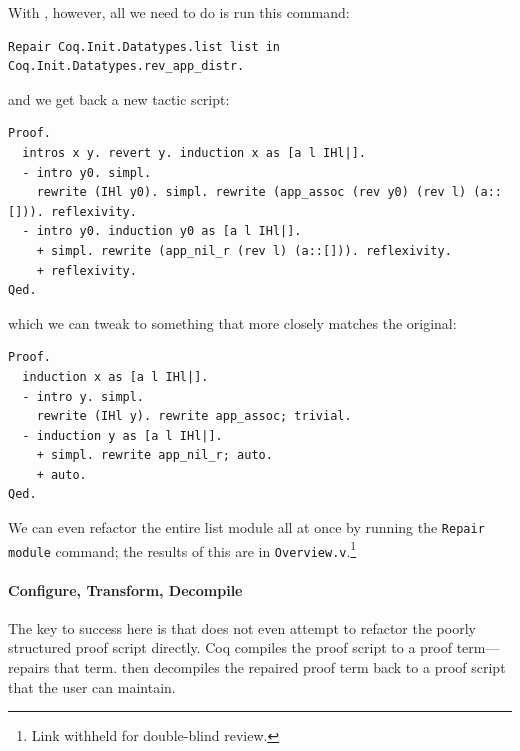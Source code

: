 With \toolname, however, all we need to do is run this command: %

\begin{lstlisting}
Repair Coq.Init.Datatypes.list list in Coq.Init.Datatypes.rev_app_distr.
\end{lstlisting}
and we get back a new tactic script:

\begin{lstlisting}
Proof.
  intros x y. revert y. induction x as [a l IHl|].
  - intro y0. simpl.
    rewrite (IHl y0). simpl. rewrite (app_assoc (rev y0) (rev l) (a::[])). reflexivity.
  - intro y0. induction y0 as [a l IHl|].
    + simpl. rewrite (app_nil_r (rev l) (a::[])). reflexivity.
    + reflexivity.
Qed.
\end{lstlisting}
which we can tweak to something that more closely matches the original:

\begin{lstlisting}
Proof.
  induction x as [a l IHl|].
  - intro y. simpl.
    rewrite (IHl y). rewrite app_assoc; trivial.
  - induction y as [a l IHl|].
    + simpl. rewrite app_nil_r; auto.
    + auto.
Qed.
\end{lstlisting}
We can even refactor the entire list module all at once by running the \lstinline{Repair module}
command; the results of this are in \lstinline{Overview.v}.\footnote{Link withheld for double-blind review.} %

\paragraph{Configure, Transform, Decompile}
The key to success here is that \toolname does not even attempt to refactor the poorly structured proof script directly.
Coq compiles the proof script to a proof term---\toolname repairs that term.
\toolname then decompiles the repaired proof term back to a proof script that the user can maintain.

